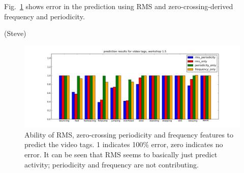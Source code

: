 \documentclass{article}
\begin{document}
Fig.~\ref{fig:predresults} shows error in the prediction using RMS and
zero-crossing-derived frequency and periodicity.

(Steve)

\begin{figure}
\centerline{\includegraphics[width=\textwidth]{images/predictionresults.png}}
\caption{Ability of RMS, zero-crossing periodicity and frequency
  features to predict the video tags.  1 indicates 100\% error, zero
  indicates no error.  It can be seen that RMS seems to basically just
  predict activity; periodicity and frequency are not contributing.}
\label{fig:predresults}
\end{figure}
\end{document}
